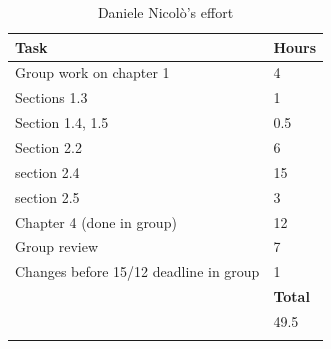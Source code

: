 \documentclass[titlepage]{article}
\begin{document}
	
	
	\begin{longtable}{| p{12 cm} | p{2 cm} |} 
		\hline
		{\bf Task} & {\bf Hours}\\
		\hline
		 Group work on chapter 1 & 4 \\
		 Sections 1.3 & 1 \\
		 Section 1.4, 1.5 & 0.5 \\
		 Section 2.2 & 6\\ 
		 section 2.4 & 15 \\
		 section 2.5 & 3 \\
		 Chapter 4 (done in group)& 12 \\
		 Group review & 7\\
		 Changes before 15/12 deadline in group & 1 \\
		\hline
		&  {\bf Total} \\
		\hline
		&  49.5 \\
		\hline
		\caption{Daniele Nicolò's effort}
	\end{longtable}
\end{document}
